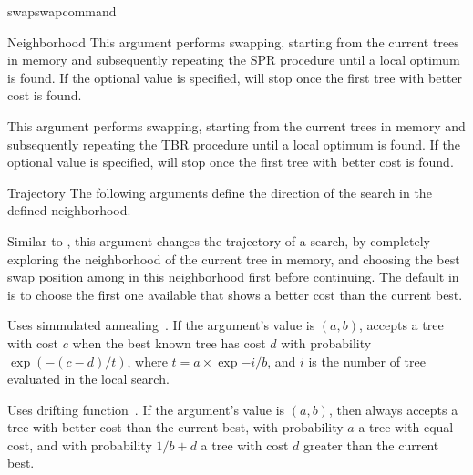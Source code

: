 \begin{command}{swap}{swapcommand}
\begin{arguments}
\begin{argumentgroup}{Neighborhood}
	{This argument performs  swapping, starting
                from the current trees in memory and subsequently repeating
                the SPR procedure until  a local optimum is found. If the optional value
                 is specified,  
                will stop once the first tree with better cost is found.} 
                {}

	      {This argument performs  swapping, starting
                from the current trees in memory and subsequently repeating
                the TBR procedure until  a local optimum is found.  If the optional value
                 is specified,  
                will stop once the first tree with better cost is found.}
                {}

        \end{argumentgroup}

    \begin{argumentgroup}{Trajectory}
        {The following arguments define the direction of the search in the defined
        neighborhood.}

            {Similar to , this
            argument changes the trajectory of a search, by
            completely exploring the neighborhood of the current
            tree in memory, and choosing the best swap position
            among in this neighborhood first before continuing.
            The default in \poy is to choose the first one
            available that shows a better cost than the current
            best.}
            {}

            {Uses simmulated annealing~\cite{Kirkpatrick1983}. If the argument's value is $(a, b)$, 
            \poy accepts a tree with cost $c$ when the best known tree has
            cost $d$ with probability $\exp{(- (c - d) / t)}$, where
            $t = a \times \exp{- i / b}$, and $i$ is the number of tree
            evaluated in the local search.}
            {}

            {Uses \poy drifting function~\cite{goloboff1999}. If the argument's value is
            $(a, b)$, then \poy always accepts a tree with better cost than
            the current best, with probability $a$ a tree with equal cost,
            and with probability $1 / b + d$ a tree with cost $d$ greater
            than the current best.}
            {}


\end{argumentgroup}
\end{arguments}
\end{command}
